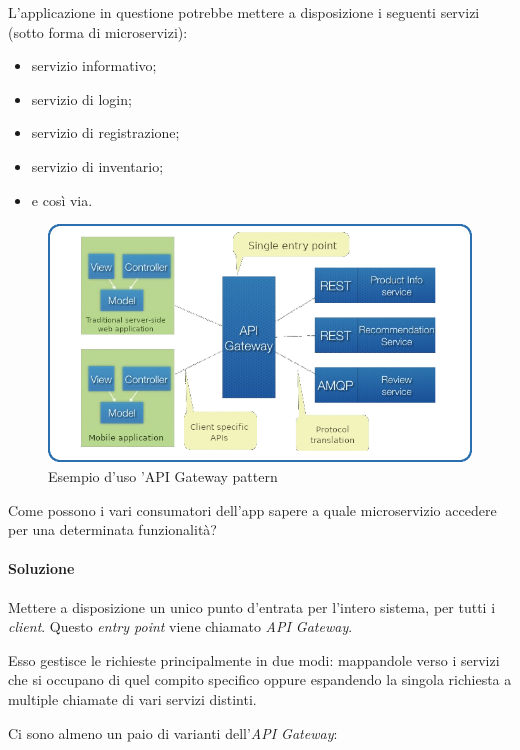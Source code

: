 L'applicazione in questione potrebbe mettere a disposizione i seguenti servizi (sotto forma di microservizi):
\begin{itemize}[noitemsep]
	\item servizio informativo;
	\item servizio di login;
	\item servizio di registrazione;
	\item servizio di inventario;
	\item e così via.
\end{itemize}

\begin{figure}[H]
	\centering
	\includegraphics[width=\textwidth]{immagini/apigateway.png}
	\caption[Esempio d'uso API Gateway]{Esempio d'uso 'API Gateway pattern\footnotemark}
	\label{fig:api-gateway}
\end{figure}

Come possono i vari consumatori dell'app sapere a quale \gls{microservizio} accedere per una determinata funzionalità?

\paragraph*{Soluzione} Mettere a disposizione un unico punto d'entrata per l'intero sistema, per tutti i \textit{client}.
Questo \textit{entry point} viene chiamato \textit{API Gateway}.

Esso gestisce le richieste principalmente in due modi:
mappandole verso i servizi che si occupano di quel compito specifico oppure espandendo la singola richiesta a multiple chiamate di vari servizi distinti.

Ci sono almeno un paio di varianti dell'\textit{API Gateway}:

